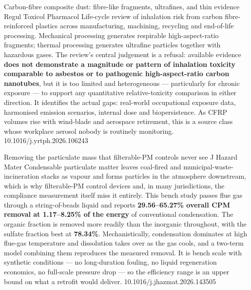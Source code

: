 \documentclass[10pt]{article}
\begin{document}
{Carbon-fibre composite dust: fibre-like fragments, ultrafines, and thin evidence}
{Regul Toxicol Pharmacol}
{Life-cycle review of inhalation risk from carbon fibre-reinforced plastics across
manufacturing, machining, recycling and end-of-life processing. Mechanical processing
generates respirable high-aspect-ratio fragments; thermal processing generates ultrafine
particles together with hazardous gases. The review's central judgement is a refusal:
available evidence \textbf{does not demonstrate a magnitude or pattern of inhalation
toxicity comparable to asbestos or to pathogenic high-aspect-ratio carbon nanotubes}, but it
is too limited and heterogeneous --- particularly for chronic exposure --- to support any
quantitative relative-toxicity comparison in either direction. It identifies the actual
gaps: real-world occupational exposure data, harmonised emission scenarios, internal dose
and biopersistence. As CFRP volumes rise with wind-blade and aerospace retirement, this is
a source class whose workplace aerosol nobody is routinely monitoring.}
{10.1016/j.yrtph.2026.106243}

\clearpage


{Removing the particulate mass that filterable-PM controls never see}
{J Hazard Mater}
{Condensable particulate matter leaves coal-fired and municipal-waste-incineration stacks as
vapour and forms particles in the atmosphere downstream, which is why filterable-PM control
devices and, in many jurisdictions, the compliance measurement itself miss it entirely. This
bench study passes flue gas through a string-of-beads liquid and reports \textbf{29.56--65.27\%
overall CPM removal at 1.17--8.25\% of the energy} of conventional condensation. The organic
fraction is removed more readily than the inorganic throughout, with the sulfate fraction
best at \textbf{78.34\%}. Mechanistically, condensation dominates at high flue-gas
temperature and dissolution takes over as the gas cools, and a two-term model combining them
reproduces the measured removal. It is bench scale with synthetic conditions --- no
long-duration fouling, no liquid regeneration economics, no full-scale pressure drop --- so
the efficiency range is an upper bound on what a retrofit would deliver.}
{10.1016/j.jhazmat.2026.143505}
\end{document}
